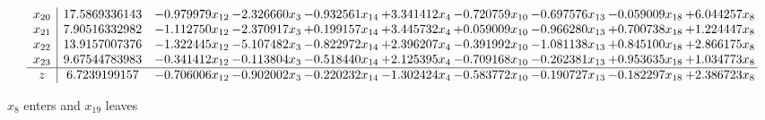 \documentclass[10pt]{article}
\begin{document}
\[\begin{array}{c| c c@{\hskip 2pt} c@{\hskip 2pt} c@{\hskip 2pt} c@{\hskip 2pt} c@{\hskip 2pt} c@{\hskip 2pt} c@{\hskip 2pt} c@{\hskip 2pt} }
 x_{20}   &  17.5869336143 & -0.979979 x_{12} & -2.326660 x_{3} & -0.932561 x_{14} & + 3.341412 x_{4} & -0.720759 x_{10} & -0.697576 x_{13} & -0.059009 x_{18} & + 6.044257 x_{8}\\
 x_{21}   &  7.90516332982 & -1.112750 x_{12} & -2.370917 x_{3} & + 0.199157 x_{14} & + 3.445732 x_{4} & + 0.059009 x_{10} & -0.966280 x_{13} & + 0.700738 x_{18} & + 1.224447 x_{8}\\
 x_{22}   &  13.9157007376 & -1.322445 x_{12} & -5.107482 x_{3} & -0.822972 x_{14} & + 2.396207 x_{4} & -0.391992 x_{10} & -1.081138 x_{13} & + 0.845100 x_{18} & + 2.866175 x_{8}\\
 x_{23}   &  9.67544783983 & -0.341412 x_{12} & -0.113804 x_{3} & -0.518440 x_{14} & + 2.125395 x_{4} & -0.709168 x_{10} & -0.262381 x_{13} & + 0.953635 x_{18} & + 1.034773 x_{8}\\
\hline
z    &  6.7239199157 & -0.706006 x_{12} & -0.902002 x_{3} & -0.220232 x_{14} & -1.302424 x_{4} & -0.583772 x_{10} & -0.190727 x_{13} & -0.182297 x_{18} & + 2.386723 x_{8}\\
\end{array}\]


 $ x_{8} $ enters and $ x_{19} $ leaves 
\end{document}
